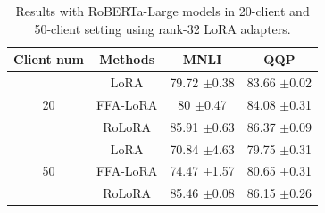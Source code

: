 \documentclass{article}
\newcommand{\com}[1]{\tiny$\pm$#1}
\theoremstyle{plain}
\theoremstyle{definition}
\theoremstyle{remark}
\begin{document}
\begin{table}
    \centering
    {\footnotesize
    \begin{tabular}{cccc}
    \toprule
    Client num     & Methods & MNLI &QQP \\
    \midrule
         & LoRA & 79.72 \com 0.38 & 83.66 \com 0.02\\
      20   & FFA-LoRA & 80 \com 0.47  & 84.08 \com 0.31 \\
         & \cellcolor{ours}RoLoRA & \cellcolor{ours}85.91 \com 0.63 &\cellcolor{ours} 86.37 \com 0.09 \\
         \midrule
         & LoRA & 70.84 \com 4.63 & 79.75 \com 0.31 \\
      50   & FFA-LoRA & 74.47 \com 1.57 & 80.65 \com 0.31 \\
         & \cellcolor{ours}RoLoRA &\cellcolor{ours} 85.46 \com 0.08 &\cellcolor{ours} 86.15 \com 0.26\\
         \bottomrule
    \end{tabular}}
    \vspace{4pt}
    \caption{Results with RoBERTa-Large models in 20-client and 50-client setting using rank-32 LoRA adapters.}
    \label{tab:rank-32}
\end{table}
\end{document}
